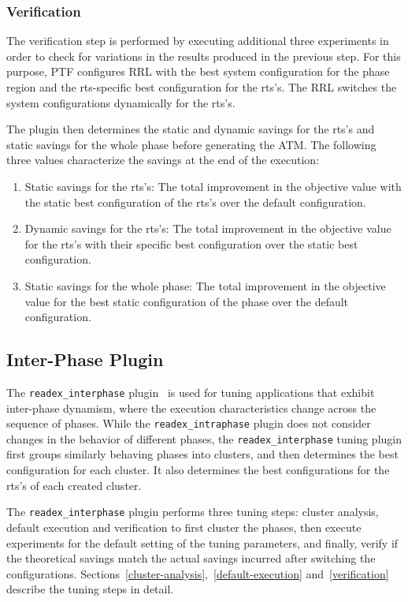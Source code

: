 \subsubsection{Verification} \label{intra-verification} 

The verification step is performed by executing additional three experiments in order to check for variations in the results produced in the previous step. For this purpose, PTF configures RRL with the best system configuration for the phase region and the rts-specific best configuration for the rts's. The RRL switches the system configurations dynamically for the rts's.

The plugin then determines the static and dynamic savings for the rts's and static savings for the whole phase before generating the ATM. The following three values characterize the savings at the end of the execution:

\begin{enumerate}
	\item Static savings for the rts's: The total improvement in the objective value with the static best configuration of the rts's over the default configuration. 
	\item Dynamic savings for the rts's: The total improvement in the objective value for the rts's with their specific best configuration over the static best configuration.
	\item Static savings for the whole phase: The total improvement in the objective value for the best static configuration of the phase over the default configuration.
\end{enumerate}


\subsection{Inter-Phase Plugin} \label{sec:inter-phase}

The \texttt{readex\_interphase} plugin~\cite{PDPTA_18_Kumaraswamy} is used for tuning applications that exhibit inter-phase dynamism, where the execution characteristics change across the sequence of phases. While the \texttt{readex\_intraphase} plugin does not consider changes in the behavior of different phases, the \texttt{readex\_interphase} tuning plugin first groups similarly behaving phases into clusters, and then determines the best configuration for each cluster. It also determines the best configurations for the rts's of each created cluster.

The \texttt{readex\_interphase} plugin performs three tuning steps: cluster analysis, default execution and verification to first cluster the phases, then execute experiments for the default setting of the tuning parameters, and finally, verify if the theoretical savings match the actual savings incurred after switching the configurations. Sections~\ref{cluster-analysis},~\ref{default-execution} and~\ref{verification} describe the tuning steps in detail.

